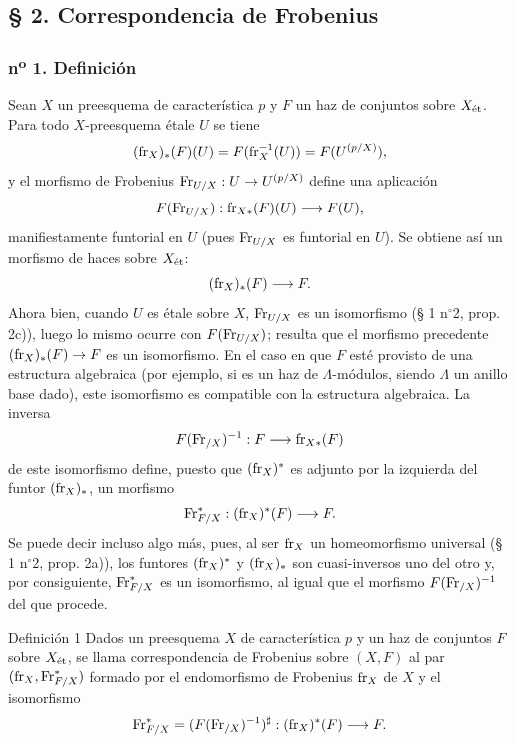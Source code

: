 \subsection*{§ 2. Correspondencia de Frobenius}

\subsubsection*{n\textsuperscript{o} 1. Definición}

Sean $X$ un preesquema de característica $p$ y $F$ un haz de conjuntos sobre $X_{\mathrm{\acute{e}t}}$. Para todo $X$-preesquema étale $U$ se tiene
\[
(\operatorname{fr}_X)_*(F)(U)=F(\operatorname{fr}_X^{-1}(U))=F(U^{(p/X)}),
\]
y el morfismo de Frobenius $\operatorname{Fr}_{U/X}:U\to U^{(p/X)}$ define una aplicación
\[
F(\operatorname{Fr}_{U/X}):\operatorname{fr}_{X*}(F)(U)\longrightarrow F(U),
\]
manifiestamente funtorial en $U$ (pues $\operatorname{Fr}_{U/X}$ es funtorial en $U$). Se obtiene así un morfismo de haces sobre $X_{\mathrm{\acute{e}t}}$:
\[
(\operatorname{fr}_X)_*(F)\longrightarrow F.
\]
Ahora bien, cuando $U$ es étale sobre $X$, $\operatorname{Fr}_{U/X}$ es un isomorfismo (§ 1 n$^\circ$2, prop. 2c)), luego lo mismo ocurre con $F(\operatorname{Fr}_{U/X})$; resulta que el morfismo precedente $(\operatorname{fr}_X)_*(F)\to F$ es un isomorfismo. En el caso en que $F$ esté provisto de una estructura algebraica (por ejemplo, si es un haz de $\Lambda$-módulos, siendo $\Lambda$ un anillo base dado), este isomorfismo es compatible con la estructura algebraica. La inversa
\[
F(\operatorname{Fr}_{/X})^{-1}:F\longrightarrow \operatorname{fr}_{X*}(F)
\]
de este isomorfismo define, puesto que $(\operatorname{fr}_X)^*$ es adjunto por la izquierda del funtor $(\operatorname{fr}_X)_*$, un morfismo
\[
\operatorname{Fr}^*_{F/X}:(\operatorname{fr}_X)^*(F)\longrightarrow F.
\]
Se puede decir incluso algo más, pues, al ser $\operatorname{fr}_X$ un homeomorfismo universal (§ 1 n$^\circ$2, prop. 2a)), los funtores $(\operatorname{fr}_X)^*$ y $(\operatorname{fr}_X)_*$ son cuasi-inversos uno del otro y, por consiguiente, $\operatorname{Fr}^*_{F/X}$ es un isomorfismo, al igual que el morfismo $F(\operatorname{Fr}_{/X})^{-1}$ del que procede.

\begin{statement}{Definición 1}
Dados un preesquema $X$ de característica $p$ y un haz de conjuntos $F$ sobre $X_{\mathrm{\acute{e}t}}$, se llama correspondencia de Frobenius sobre $(X,F)$ al par $(\operatorname{fr}_X,\operatorname{Fr}^*_{F/X})$ formado por el endomorfismo de Frobenius $\operatorname{fr}_X$ de $X$ y el isomorfismo
\[
\operatorname{Fr}^*_{F/X}=(F(\operatorname{Fr}_{/X})^{-1})^\sharp:(\operatorname{fr}_X)^*(F)\longrightarrow F.
\]
\end{statement}
